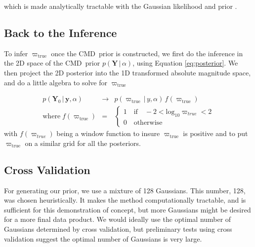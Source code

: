 \documentclass[modern]{aastex61}
\newcommand{\acronym}[1]{{\small{#1}}}
\newcommand{\cmd}{\acronym{CMD}}
\newcommand{\given}{\,|\,}
\newcommand{\true}{\mathrm{true}}
\begin{document}
which is made analytically tractable with the Gaussian likelihood and prior \citep{bovy11}.

\subsection{Back to the Inference}

To infer $\varpi_{\true}$ once the \cmd\ prior is constructed, we first do the inference in the 2D space of the \cmd\ prior $p(\mathbf{Y} \given \alpha)$, using Equation \ref{eq:posterior}. We then project the 2D posterior into the 1D transformed absolute magnitude space, and do a little algebra to solve for $\varpi_{\true}$

\begin{eqnarray}
p(\mathbf{Y}_0 \given \mathbf{y}, \alpha) &\rightarrow& p(\varpi_{\true} \given y, \alpha) \, f(\varpi_{\true}) \\
\mathrm{where} \; f(\varpi_{\true}) &=& \begin{cases}
              1 \quad \mathrm{if} \quad -2 < \mathrm{log}_{10} \varpi_{true} < 2\\
              0 \quad \mathrm{otherwise}
              \end{cases}
\label{eq:parallaxPost}
\end{eqnarray}
with $f(\varpi_{true})$ being a window function to insure $\varpi_{\true}$ is positive and to put $\varpi_{\true}$ on a similar grid for all the posteriors.

\subsection{Cross Validation}
For generating our prior, we use a mixture of 128 Gaussians. This number, 128, was chosen heuristically. It makes the method computationally tractable, and is sufficient for this demonstration of concept, but more Gaussians might be desired for a more final data product. We would ideally use the optimal number of Gaussians determined by cross validation, but preliminary tests using cross validation suggest the optimal number of Gaussians is very large.
\end{document}

